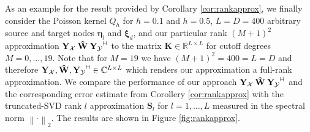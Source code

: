 \documentclass[11pt,a4paper,twoside,bibtotoc]{scrartcl}
\theoremstyle{plain}
\theoremstyle{definition}
\theoremstyle{remark}
\newcommand{\adj}{{\vdash \hspace*{-1.72mm} \dashv}}
\newcommand{\R}{\ensuremath{\mathbb{R}}}
\newcommand{\C}{\ensuremath{\mathbb{C}}}
\newcommand{\mb}[1]{\mathbf{#1}}
\newcommand{\V}[1]{\mb{#1}}
\numberwithin{equation}{section}
\numberwithin{table}{section}
\numberwithin{figure}{section}
\begin{document}
As an example for the result provided by Corollary \ref{cor:rankapprox}, we 
finally consider the Poisson kernel $Q_{h}$ for 
$h = 0.1$ and $h=0.5$, $L=D=400$ arbitrary source and target nodes $\V{\eta}_{l}$ and $\V{\xi}_{d}$,
and our particular rank $(M+1)^2$ approximation 
$\V{Y_{\mathcal{X}}} \: \V{\hat W} \: \V{Y_{\mathcal{Y}}}^{\adj}$ to the matrix $\V{K} \in \R^{L \times L}$ 
for cutoff degrees $M=0,\ldots,19$. Note that for $M=19$ we 
have $(M+1)^2 = 400 = L = D$ and therefore $\V{Y_{\mathcal{X}}}, \V{\hat W}, 
\V{Y_{\mathcal{Y}}}^{\adj} \in \C^{L \times L}$ which renders our approximation a full-rank 
approximation. We compare the performance of our approach $\V{Y_{\mathcal{X}}} \: \V{\hat W} \: 
\V{Y_{\mathcal{Y}}}^{\adj}$ and the corresponding error estimate from Corollery \ref{cor:rankapprox}
with the truncated-SVD rank $l$ approximation $\V{S}_{l}$ for $l = 1,\ldots,L$
measured in the spectral norm $\left\|\cdot\right\|_{2}$. The results are shown in Figure \ref{fig:rankapprox}. 
\end{document}
